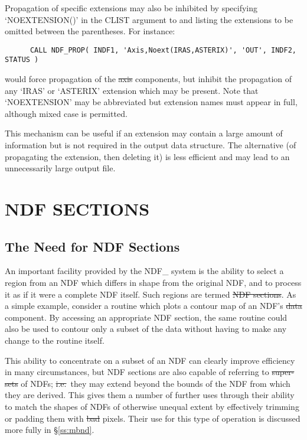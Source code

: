 Propagation of specific extensions may also be inhibited by specifying
`NOEXTENSION()' in the CLIST argument to  and listing the
extensions to be omitted between the parentheses. 
For instance:

\small
\begin{verbatim}
      CALL NDF_PROP( INDF1, 'Axis,Noext(IRAS,ASTERIX)', 'OUT', INDF2, STATUS )
\end{verbatim}
\normalsize

would force propagation of the \st{axis\/} components, but inhibit the
propagation of any `IRAS' or `ASTERIX' extension which may be present. 
Note that `NOEXTENSION' may be abbreviated but extension names must appear 
in full, although mixed case is permitted.

This mechanism can be useful if an extension may contain a large amount of
information but is not required in the output data structure. 
The alternative (of propagating the extension, then deleting it) is less
efficient and may lead to an unnecessarily large output file. 


\section{\label{ss:ndfsections}NDF SECTIONS}

\subsection{The Need for NDF Sections}

An important facility provided by the NDF\_ system is the ability to select
a region from an NDF which differs in shape from the original NDF, and to
process it as if it were a complete NDF itself. 
Such regions are termed \st{NDF sections}.
As a simple example, consider a routine which plots a contour map of an
NDF's \st{data\/} component. 
By accessing an appropriate NDF section, the same routine could also be used
to contour only a subset of the data without having to make any change to
the routine itself.

This ability to concentrate on a subset of an NDF can clearly improve
efficiency in many circumstances, but NDF sections are also capable of
referring to \st{super-sets\/} of NDFs; \st{i.e.}\ they may extend beyond the
bounds of the NDF from which they are derived. 
This gives them a number of further uses through their ability to match the
shapes of NDFs of otherwise unequal extent by effectively trimming or
padding them with \st{bad\/} pixels. 
Their use for this type of operation is discussed more fully in 
\S\ref{ss:mbnd}.

